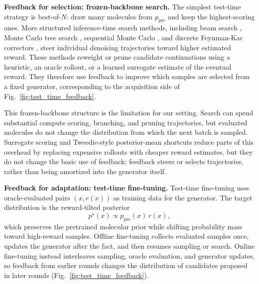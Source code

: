 \documentclass{article}
\begin{document}
\textbf{Feedback for selection: frozen-backbone search.}
The simplest test-time strategy is best-of-$N$: draw many molecules from $p_{\mathrm{pre}}$ and keep the highest-scoring ones. More structured inference-time search methods, including beam search \citep{ramesh2025noisetrajectory}, Monte Carlo tree search \citep{tangTR2D2TreeSearch2025}, sequential Monte Carlo \citep{skretaFeynmanKacCorrectorsDiffusion2025}, and discrete Feynman-Kac correctors \citep{hasanDiscreteFeynmanKacCorrectors2026, skretaFeynmanKacCorrectorsDiffusion2025}, steer individual denoising trajectories toward higher estimated reward. These methods reweight or prune candidate continuations using a heuristic, an oracle rollout, or a learned surrogate estimate of the eventual reward. They therefore use feedback to improve which samples are selected from a fixed generator, corresponding to the acquisition side of Fig.~\ref{fig:test_time_feedback}.

This frozen-backbone structure is the limitation for our setting. Search can spend substantial compute scoring, branching, and pruning trajectories, but evaluated molecules do not change the distribution from which the next batch is sampled. Surrogate scoring and Tweedie-style posterior-mean shortcuts reduce parts of this overhead by replacing expensive rollouts with cheaper reward estimates, but they do not change the basic use of feedback: feedback steers or selects trajectories, rather than being amortized into the generator itself.

\textbf{Feedback for adaptation: test-time fine-tuning.}
Test-time fine-tuning uses oracle-evaluated pairs $(x,r(x))$ as training data for the generator. The target distribution is the reward-tilted posterior
\[
p^\star(x) \propto p_{\mathrm{pre}}(x)\,r(x),
\]
which preserves the pretrained molecular prior while shifting probability mass toward high-reward samples. Offline fine-tuning collects evaluated samples once, updates the generator after the fact, and then resumes sampling or search. Online fine-tuning instead interleaves sampling, oracle evaluation, and generator updates, so feedback from earlier rounds changes the distribution of candidates proposed in later rounds (Fig.~\ref{fig:test_time_feedback}).
\end{document}
